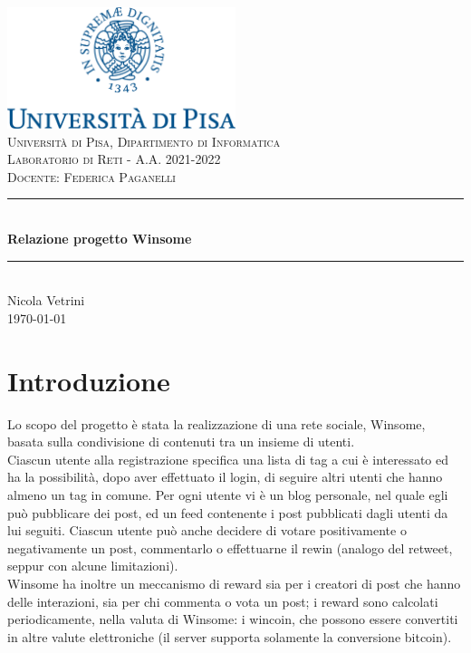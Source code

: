 \documentclass[a4paper,11pt]{article}
\newcommand{\HRule}{\rule{\linewidth}{0.5mm}} 	%
\begin{document}
	\hypersetup{pageanchor=false}
	\begin{titlepage}
		\begin{center}
			\includegraphics[width=0.5\textwidth]{img/unipi-logo.png}\\[1cm]
			
			\textsc{\Large Università di Pisa, Dipartimento di Informatica}\\[1cm]
			
			\textsc{\Large Laboratorio di Reti - A.A. 2021-2022}\\[0.2cm]
			\textsc{\large Docente: Federica Paganelli}\\[1cm]
			
			\HRule \\[0.8cm]
			{ \Large \bfseries Relazione progetto Winsome}\\[0.7cm]
			\HRule \\[2cm]
			
			\large Nicola Vetrini\\[0.cm]
			{\large \today}\\[5cm]
			
			\vfill
		\end{center}
	\end{titlepage}
	\hypersetup{pageanchor=true}
	
	\clearpage
	\tableofcontents
	\clearpage
	
	\section{Introduzione}
	Lo scopo del progetto è stata la realizzazione di una rete sociale, Winsome, basata sulla condivisione	di contenuti tra un insieme di utenti. \\
	Ciascun utente alla registrazione specifica una lista di tag
	a cui è interessato ed ha la possibilità, dopo aver effettuato il login, di seguire altri utenti che
	hanno almeno un tag in comune. Per ogni utente vi è un blog personale, nel quale
	egli può pubblicare dei post, ed un feed contenente i post pubblicati dagli utenti da lui seguiti. 
	Ciascun utente può anche decidere di votare positivamente o negativamente un post, commentarlo o effettuarne il rewin (analogo del retweet, seppur con alcune limitazioni). \\
	Winsome ha inoltre un meccanismo di reward sia per i creatori di post che hanno delle interazioni, sia per chi commenta o vota un post; i reward sono calcolati periodicamente, nella valuta di Winsome: i wincoin, che possono essere convertiti in altre valute elettroniche (il server supporta solamente la conversione bitcoin).\\
	
	
	
	
	
	
	
	
	
	
\end{document}
